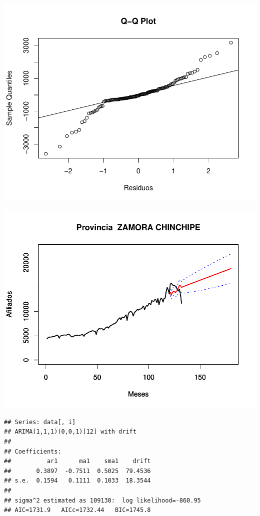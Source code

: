 \documentclass[11pt,a4paper,oneside]{article}\usepackage[]{graphicx}\usepackage[]{color}
\makeatletter
\def\maxwidth{ %
  \ifdim\Gin@nat@width>\linewidth
    \linewidth
  \else
    \Gin@nat@width
  \fi
}
\newenvironment{kframe}{%
 \def\at@end@of@kframe{}%
 \ifinner\ifhmode%
  \def\at@end@of@kframe{\end{minipage}}%
  \begin{minipage}{\columnwidth}%
 \fi\fi%
 \def\FrameCommand##1{\hskip\@totalleftmargin \hskip-\fboxsep
 \colorbox{shadecolor}{##1}\hskip-\fboxsep
     \hskip-\linewidth \hskip-\@totalleftmargin \hskip\columnwidth}%
 \MakeFramed {\advance\hsize-\width
   \@totalleftmargin\z@ \linewidth\hsize
   \@setminipage}}%
 {\par\unskip\endMakeFramed%
 \at@end@of@kframe}
\newenvironment{knitrout}{}{} %
\makeatother
\begin{document}
\begin{knitrout}
{}




{\centering \includegraphics[width=\maxwidth]{figure/unnamed-chunk-16-69} 

}




{\centering \includegraphics[width=\maxwidth]{figure/unnamed-chunk-16-70} 

}


\begin{kframe}\begin{verbatim}
## Series: data[, i] 
## ARIMA(1,1,1)(0,0,1)[12] with drift         
## 
## Coefficients:
##          ar1      ma1    sma1    drift
##       0.3897  -0.7511  0.5025  79.4536
## s.e.  0.1594   0.1111  0.1033  18.3544
## 
## sigma^2 estimated as 109130:  log likelihood=-860.95
## AIC=1731.9   AICc=1732.44   BIC=1745.8
\end{verbatim}
\end{kframe}


\end{knitrout}
\end{document}
